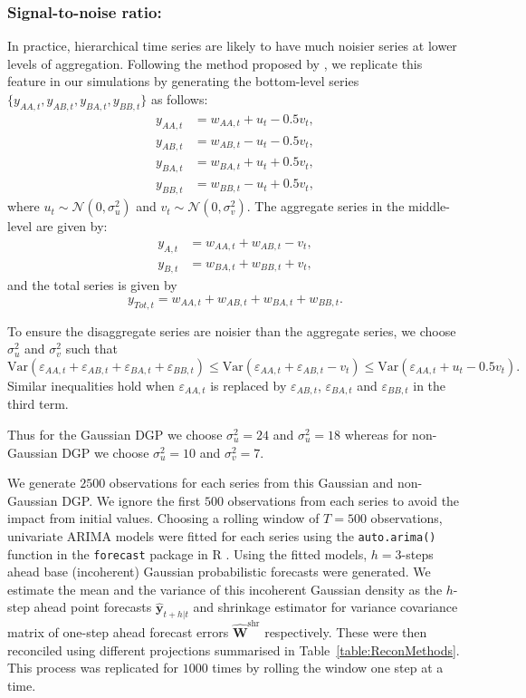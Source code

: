 \documentclass[12pt]{article}
\def\var{\text{Var}}
\theoremstyle{definition}
\begin{document}
\subsubsection*{Signal-to-noise ratio:}

In practice, hierarchical time series are likely to have much noisier series at lower levels of aggregation. Following the method proposed by \citet{WicEtAl2019}, we replicate this feature in our simulations by generating the bottom-level series $\{y_{AA,t},y_{AB,t},y_{BA,t},y_{BB,t}\}$ as follows: 
\begin{align*}
y_{AA,t} &= w_{AA,t} + u_t - 0.5v_t,\\
y_{AB,t} &= w_{AB,t} - u_t - 0.5v_t,\\
y_{BA,t} &= w_{BA,t} + u_t + 0.5v_t,\\
y_{BB,t} &= w_{BB,t} - u_t + 0.5v_t,
\end{align*}
where $u_t \sim \mathcal{N}(0,\sigma^2_u)$ and $v_t \sim \mathcal{N}(0,\sigma^2_v)$. The aggregate series in the middle-level are given by:
\begin{align*}
y_{A,t} &= w_{AA,t} + w_{AB,t} - v_t,\\
y_{B,t} &= w_{BA,t} + w_{BB,t} + v_t,
\end{align*}
and the total series is given by
\[
y_{Tot,t} = w_{AA,t} + w_{AB,t} + w_{BA,t} + w_{BB,t}.
\]


To ensure the disaggregate series are noisier than the aggregate series, we choose $\sigma^2_u$ and $\sigma^2_v$ such that
\[
\var(\varepsilon_{AA,t} + \varepsilon_{AB,t} + \varepsilon_{BA,t} + \varepsilon_{BB,t})
\le \var(\varepsilon_{AA,t}+\varepsilon_{AB,t}-v_t)
\le \var(\varepsilon_{AA,t}+u_t-0.5v_t).
\]
Similar inequalities hold when $\varepsilon_{AA,t}$ is replaced by $\varepsilon_{AB,t}$, $\varepsilon_{BA,t}$ and $\varepsilon_{BB,t}$ in the third term.

Thus for the Gaussian DGP we choose $\sigma^2_u = 24$ and $\sigma^2_u = 18$ whereas for non-Gaussian DGP we choose $\sigma^2_u = 10$ and $\sigma^2_v = 7$.

We generate $2500$ observations for each series from this Gaussian and non-Gaussian DGP. We ignore the first $500$ observations from each series to avoid the impact from initial values. Choosing a rolling window of $T=500$ observations, univariate ARIMA models were fitted for each series using the \verb|auto.arima()| function in the \verb|forecast| package \citep{hyndman2019forecasting} in R \citep{Rcore}. Using the fitted models, $h=3$-steps ahead base (incoherent) Gaussian probabilistic forecasts were generated. We estimate the mean and the variance of this incoherent Gaussian density as the $h$-step ahead point forecasts $\hat{\bm{y}}_{t+h|t}$ and shrinkage estimator for variance covariance matrix of one-step ahead forecast errors $\hat{\bm{W}}^{\text{shr}}$ respectively. These were then reconciled using different projections summarised in Table~\ref{table:ReconMethods}. This process was replicated for $1000$ times by rolling the window one step at a time.
\end{document}

